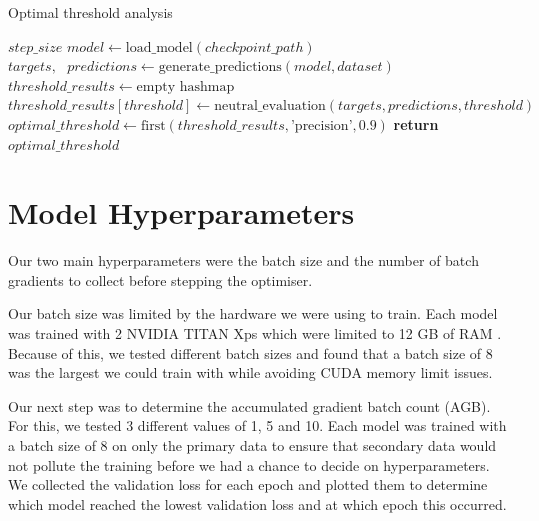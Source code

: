 \begin{algorithm}[H]
    \caption{Optimal threshold analysis}
    \begin{algorithmic}[1]
        \Require $step\_size$
        \State $model \gets \text{load\_model}(checkpoint\_path)$
        \State $targets,\text{ }predictions \gets \text{generate\_predictions}(model, dataset)$
        \State
        \State $threshold\_results \gets \text{empty hashmap}$
        \State $threshold\_results[threshold] \gets \text{neutral\_evaluation}(targets, predictions, threshold)$
        \EndFor
        \State $optimal\_threshold \gets \text{first}(threshold\_results, \text{'precision'}, 0.9) $
        \State
        \State \textbf{return} $optimal\_threshold$
        \EndFunction
    \end{algorithmic}
    \label{alg:threshold_search}
\end{algorithm}

\section{Model Hyperparameters}

Our two main hyperparameters were the batch size and the number of batch gradients to collect before stepping the optimiser.

Our batch size was limited by the hardware we were using to train. Each model was trained with 2 NVIDIA TITAN Xps which were limited to 12 GB of RAM \cite{nvidia-titan-xp}. Because of this, we tested different batch sizes and found that a batch size of 8 was the largest we could train with while avoiding CUDA memory limit issues.

Our next step was to determine the accumulated gradient batch count (AGB). For this, we tested 3 different values of 1, 5 and 10. Each model was trained with a batch size of 8 on only the primary data to ensure that secondary data would not pollute the training before we had a chance to decide on hyperparameters. We collected the validation loss for each epoch and plotted them to determine which model reached the lowest validation loss and at which epoch this occurred.

